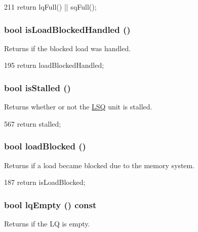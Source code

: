 \begin{DoxyCode}
211 { return lqFull() || sqFull(); }
\end{DoxyCode}
\hypertarget{classLSQUnit_ad0aa91a7b51ca925abf9c9992abad314}{
\subsubsection[{isLoadBlockedHandled}]{\setlength{\rightskip}{0pt plus 5cm}bool isLoadBlockedHandled ()}}
\label{classLSQUnit_ad0aa91a7b51ca925abf9c9992abad314}
Returns if the blocked load was handled. 


\begin{DoxyCode}
195     { return loadBlockedHandled; }
\end{DoxyCode}
\hypertarget{classLSQUnit_af8eb8590fbfa6ecd2f796390677a4c00}{
\subsubsection[{isStalled}]{\setlength{\rightskip}{0pt plus 5cm}bool isStalled ()}}
\label{classLSQUnit_af8eb8590fbfa6ecd2f796390677a4c00}
Returns whether or not the \hyperlink{classLSQ}{LSQ} unit is stalled. 


\begin{DoxyCode}
567 { return stalled; }
\end{DoxyCode}
\hypertarget{classLSQUnit_a05c413ba417c6453e99f75d87c958590}{
\subsubsection[{loadBlocked}]{\setlength{\rightskip}{0pt plus 5cm}bool loadBlocked ()}}
\label{classLSQUnit_a05c413ba417c6453e99f75d87c958590}
Returns if a load became blocked due to the memory system. 


\begin{DoxyCode}
187     { return isLoadBlocked; }
\end{DoxyCode}
\hypertarget{classLSQUnit_a01d2807c1345befcffd168a2a9dbdbf2}{
\subsubsection[{lqEmpty}]{\setlength{\rightskip}{0pt plus 5cm}bool lqEmpty () const}}
\label{classLSQUnit_a01d2807c1345befcffd168a2a9dbdbf2}
Returns if the LQ is empty. 


